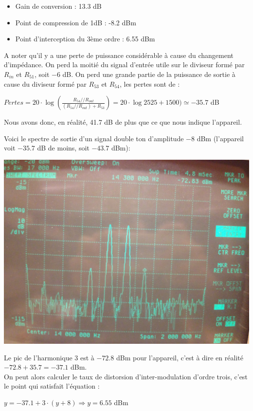 \documentclass{article}
\begin{document}

\begin{itemize}

\item Gain de conversion : 13.3 dB
\item Point de compression de 1dB : -8.2 dBm
\item Point d'interception du 3ème ordre : 6.55 dBm
\end{itemize}

A noter qu'il y a une perte de puissance considérable à cause du changement d'impédance. On perd la moitié du signal d'entrée utile sur le diviseur formé par $R_{in}$ et $R_{51}$, soit $-6$ dB. On perd une grande partie de la puissance de sortie à cause du diviseur formé par $R_{53}$ et $R_{54}$, les pertes sont de :
\begin{center}
$Pertes = 20\cdot \log (\frac{R_{54} // R_{out}}{(R_{54} // R_{out})+R_{53}}) = 20\cdot \log{25}{25+1500}) \simeq -35.7$ dB
\end{center}

Nous avons donc, en réalité, 41.7 dB de plus que ce que nous indique l'appareil.

Voici le spectre de sortie d'un signal double ton d'amplitude $-8$ dBm (l'appareil voit $-35.7$ dB de moins, soit $-43.7$ dBm):\\
\begin{center}
\includegraphics[width=0.7\linewidth]{8_3_4-8dbm.jpg}
\end{center}
Le pic de l'harmonique 3 est à $-72.8$ dBm pour l'appareil, c'est à dire en réalité $-72.8 + 35.7 = -37.1$ dBm.\\
On peut alors calculer le taux de distorsion d'inter-modulation d'ordre trois, c'est le point qui satisfait l'équation :
\begin{center}
$y = -37.1 + 3 \cdot (y+8) \Rightarrow y = 6.55$ dBm
\end{center}
\end{document}
